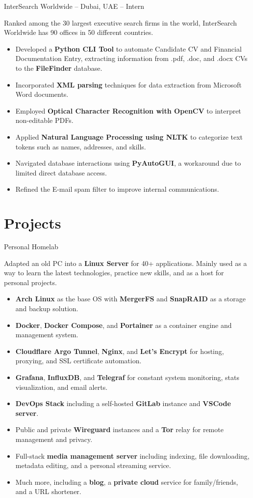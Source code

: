 \documentclass[]{prometheus_cv}
\begin{document}
{}
{InterSearch Worldwide -- Dubai, UAE -- Intern}
{
    Ranked among the 30 largest executive search firms in the world, InterSearch Worldwide has 90 offices in 50 different countries.
    \begin{itemize}
        \item Developed a \textbf{Python CLI Tool} to automate Candidate CV and Financial Documentation Entry, extracting information from .pdf, .doc, and .docx CVs to the \textbf{FileFinder} database.
        \item Incorporated \textbf{XML parsing} techniques for data extraction from Microsoft Word documents.
        \item Employed \textbf{Optical Character Recognition with OpenCV} to interpret non-editable PDFs.
        \item Applied \textbf{Natural Language Processing using NLTK} to categorize text tokens such as names, addresses, and skills.
        \item Navigated database interactions using \textbf{PyAutoGUI}, a workaround due to limited direct database access.
        \item Refined the E-mail spam filter to improve internal communications.
    \end{itemize}
}

\section{Projects}

{}
{Personal Homelab}
{
    Adapted an old PC into a \textbf{Linux Server} for 40+ applications. Mainly used as a way to learn the latest technologies, practice new skills, and as a host for personal projects.
    \begin{itemize}
        \item \textbf{Arch Linux} as the base OS with \textbf{MergerFS} and \textbf{SnapRAID} as a storage and backup solution.
        \item \textbf{Docker}, \textbf{Docker Compose}, and \textbf{Portainer} as a container engine and management system.
        \item \textbf{Cloudflare Argo Tunnel}, \textbf{Nginx}, and \textbf{Let’s Encrypt} for hosting, proxying, and SSL certificate automation.
        \item \textbf{Grafana}, \textbf{InfluxDB}, and \textbf{Telegraf} for constant system monitoring, stats visualization, and email alerts.
        \item \textbf{DevOps Stack} including a self-hosted \textbf{GitLab} instance and \textbf{VSCode server}.
        \item Public and private \textbf{Wireguard} instances and a \textbf{Tor} relay for remote management and privacy.
        \item Full-stack \textbf{media management server} including indexing, file downloading, metadata editing, and a personal streaming service.
        \item Much more, including a \textbf{blog}, a \textbf{private cloud} service for family/friends, and a URL shortener.
    \end{itemize}
}
\end{document}
